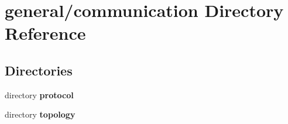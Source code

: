 \section{general/communication Directory Reference}
\label{dir_368ef012145aef7035dca8ed50f9a5db}
\subsection*{Directories}
\begin{DoxyCompactItemize}
\item 
directory {\bf protocol}
\item 
directory {\bf topology}
\end{DoxyCompactItemize}
